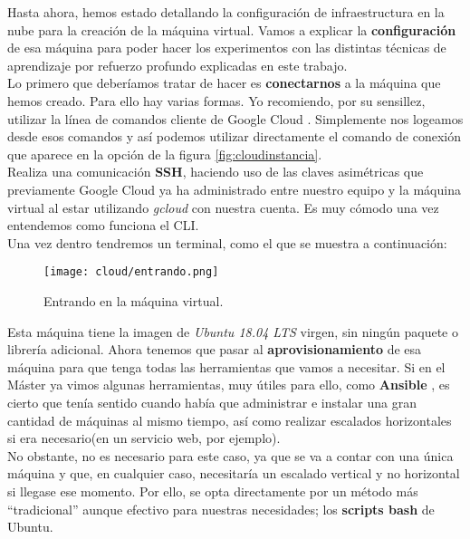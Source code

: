 \documentclass[11pt,fleqn]{book} %
\begin{document}
Hasta ahora, hemos estado detallando la configuración de infraestructura en la nube para la creación de la máquina virtual. Vamos a explicar la \textbf{configuración} de esa máquina para poder hacer los experimentos con las distintas técnicas de aprendizaje por refuerzo profundo explicadas en este trabajo. \\

Lo primero que deberíamos tratar de hacer es \textbf{conectarnos} a la máquina que hemos creado. Para ello hay varias formas. Yo recomiendo, por su sensillez, utilizar la línea de comandos cliente de Google Cloud \cite{article:gcloud}. Simplemente nos logeamos desde esos comandos y así podemos utilizar directamente el comando de conexión que aparece en la opción de la figura \ref{fig:cloudinstancia}. \\

Realiza una comunicación \textbf{SSH}, haciendo uso de las claves asimétricas que previamente Google Cloud ya ha administrado entre nuestro equipo y la máquina virtual al estar utilizando \textit{gcloud} con nuestra cuenta. Es muy cómodo una vez entendemos como funciona el CLI. \\

Una vez dentro tendremos un terminal, como el que se muestra a continuación: 

\begin{figure}[H]
	\centering\texttt{[image: cloud/entrando.png]}
	\caption{Entrando en la máquina virtual.}
	\label{fig:cloudentrando} %
\end{figure} 

Esta máquina tiene la imagen de \textit{Ubuntu 18.04 LTS} virgen, sin ningún paquete o librería adicional. Ahora tenemos que pasar al \textbf{aprovisionamiento} de esa máquina para que tenga todas las herramientas que vamos a necesitar. Si en el Máster ya vimos algunas herramientas, muy útiles para ello, como \textbf{Ansible} \cite{article:ansible}, es cierto que tenía sentido cuando había que administrar e instalar una gran cantidad de máquinas al mismo tiempo, así como realizar escalados horizontales si era necesario(en un servicio web, por ejemplo). \\

No obstante, no es necesario para este caso, ya que se va a contar con una única máquina y que, en cualquier caso, necesitaría un escalado vertical y no horizontal si llegase ese momento. Por ello, se opta directamente por un método más ``tradicional'' aunque efectivo para nuestras necesidades; los \textbf{scripts bash} de Ubuntu. \\
\end{document}
